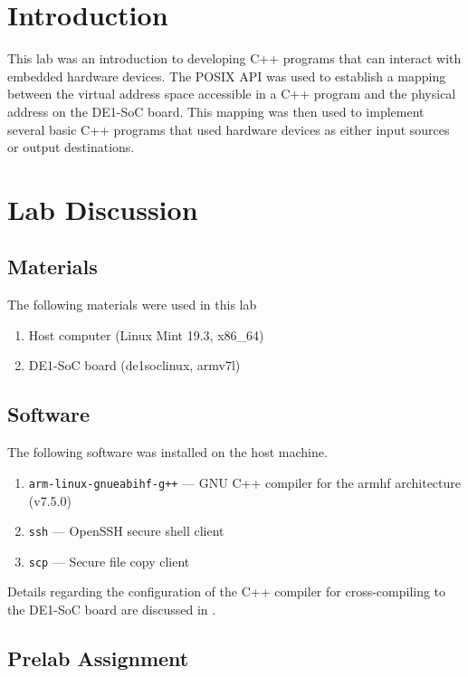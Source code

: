 \documentclass[11pt, letterpaper]{article} %
\begin{document}
\makelabtitle

\section*{Introduction}

This lab was an introduction to developing C++ programs that can interact with embedded hardware devices. The POSIX API \cite{wiki:posix} was used to establish a mapping between the virtual address space accessible in a C++ program and the physical address on the DE1-SoC board. This mapping was then used to implement several basic C++ programs that used hardware devices as either input sources or output destinations.


\section*{Lab Discussion}

\subsection*{Materials}

The following materials were used in this lab
\begin{enumerate}
    \item Host computer (Linux Mint 19.3, x86\_64)
    \item DE1-SoC board (de1soclinux, armv7l)
\end{enumerate}

\subsection*{Software}
The following software was installed on the host machine.
\begin{enumerate}
    \item \texttt{arm-linux-gnueabihf-g++} --- GNU C++ compiler for the armhf architecture (v7.5.0)
    \item \texttt{ssh} --- OpenSSH secure shell client
    \item \texttt{scp} --- Secure file copy client
\end{enumerate}

Details regarding the configuration of the C++ compiler for cross-compiling to the DE1-SoC board are discussed in \cite{report-0}.

\subsection*{Prelab Assignment}
\end{document}
